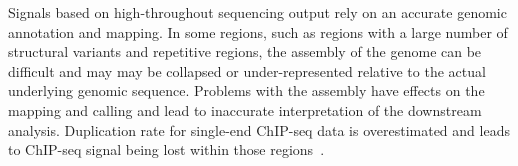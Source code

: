 Signals based on high-throughout sequencing output rely on an accurate genomic annotation and mapping.
In some regions, such as regions with a large number of structural variants and repetitive regions, the assembly of the genome can be difficult and may may be collapsed or under-represented relative to the actual underlying genomic sequence.
Problems with the assembly have effects on the mapping and calling and lead to inaccurate interpretation of the downstream analysis.
Duplication rate for single-end ChIP-seq data is overestimated and leads to ChIP-seq signal being lost within those regions~\cite{chen2012systematic}.
